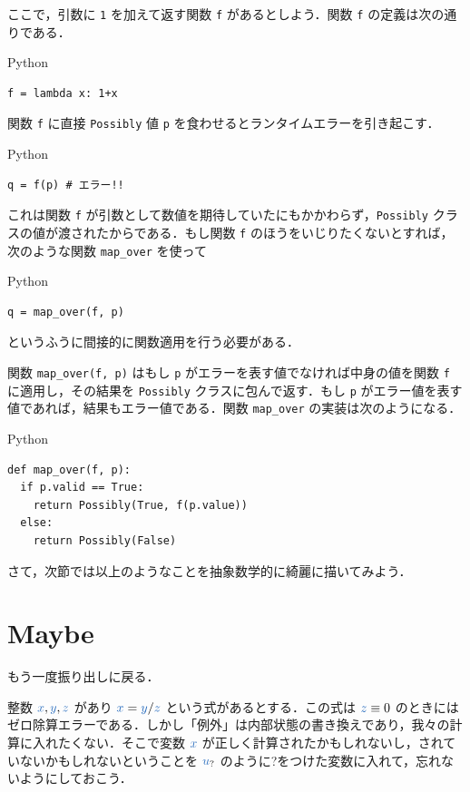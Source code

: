 \documentclass[a5paper,twoside,fleqn,draft]{jsbook}
\def\varColor{NavyBlue}
\newcommand{\programminglanguage}[1]{\textsf{#1}}
\newcommand{\python}{\programminglanguage{Python}}
\newcommand{\code}[1]{\texttt{#1}}
\newenvironment{pythoncode}{\begin{itembox}[r]{\python}}{\end{itembox}}
\newcommand{\mVar}[1]{\textcolor{\varColor}{#1}}
\newcommand{\mXVar}{\mVar{x}}
\newcommand{\mYVar}{\mVar{y}}
\newcommand{\mZVar}{\mVar{z}}
\newcommand{\mMaybe}[1]{\mVar{#1}_?}
\begin{document}
ここで，引数に \code{1} を加えて返す関数 \code{f} があるとしよう．関数 \code{f} の定義は次の通りである．
\begin{pythoncode}
\begin{verbatim}
f = lambda x: 1+x
\end{verbatim}
\end{pythoncode}

関数 \code{f} に直接 \code{Possibly} 値 \code{p} を食わせるとランタイムエラーを引き起こす．
\begin{pythoncode}
\begin{verbatim}
q = f(p) # エラー!!
\end{verbatim}
\end{pythoncode}
これは関数 \code{f} が引数として数値を期待していたにもかかわらず，\code{Possibly} クラスの値が渡されたからである．もし関数 \code{f} のほうをいじりたくないとすれば，次のような関数 \code{map\_over} を使って
\begin{pythoncode}
\begin{verbatim}
q = map_over(f, p)
\end{verbatim}
\end{pythoncode}
というふうに間接的に関数適用を行う必要がある．

関数 \code{map\_over(f, p)} はもし \code{p} がエラーを表す値でなければ中身の値を関数 \code{f} に適用し，その結果を \code{Possibly} クラスに包んで返す．もし \code{p} がエラー値を表す値であれば，結果もエラー値である．関数 \code{map\_over} の実装は次のようになる．
\begin{pythoncode}
\begin{verbatim}
def map_over(f, p):
  if p.valid == True:
    return Possibly(True, f(p.value))
  else:
    return Possibly(False)
\end{verbatim}
\end{pythoncode}

さて，次節では以上のようなことを抽象数学的に綺麗に描いてみよう．

\section{Maybe}

もう一度振り出しに戻る．

整数 $\mXVar,\mYVar,\mZVar$ があり $\mXVar=\mYVar/\mZVar$ という式があるとする．この式は $\mZVar\equiv0$ のときにはゼロ除算エラーである．しかし「例外」は内部状態の書き換えであり，我々の計算に入れたくない．そこで変数 $\mXVar$ が正しく計算されたかもしれないし，されていないかもしれないということを $\mMaybe{u}$ のように?をつけた変数に入れて，忘れないようにしておこう．
\end{document}

